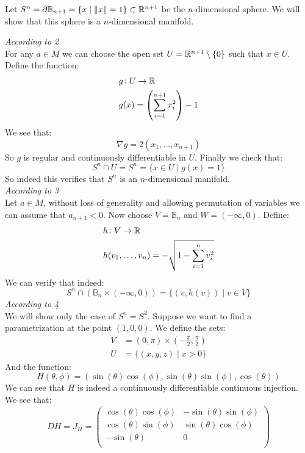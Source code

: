 \documentclass[11pt,a4paper]{article}
\begin{document}
\begin{example}
  Let $S^n = \partial \mathbb{B}_{n+1} = \{x \mid \|x\| = 1\} \subset 
  \mathbb{R}^{n+1}$ be the $n$-dimensional sphere. We will show that this
  sphere is a $n$-dimensional manifold.
\end{example}
\noindent
\emph{According to 2} \\
For any $a \in M$ we can choose the open set 
$U = \mathbb{R}^{n+1} \setminus \{0\}$ such that $x \in U$. Define the function:
\begin{align*}
  &g \colon U \to \mathbb{R} \\
  &g(x) = \left(\sum_{i=1}^{n+1}{x_i^2}\right) - 1
\end{align*}
We see that:
\[
  \nabla g = 2(x_1,\dots,x_{n+1})
\]
So $g$ is regular and continuously differentiable in $U$. Finally we
check that:
\[
  S^n \cap U = S^n = \{x \in U \mid g(x) = 1\}
\]
So indeed this verifies that $S^n$ is an $n$-dimensional manifold. \\
\noindent
\emph{According to 3} \\
Let $a \in M$, without loss of generality and allowing permutation
of variables we can assume that $a_{n+1} < 0$. Now choose 
$V = \mathbb{B}_n$ and $W = (-\infty,0)$. Define:
\begin{align*}
  &h \colon V \to \mathbb{R} \\
  &h(v_1,\dots,v_n) = - \sqrt{1 - \sum_{i=1}^{n}{v_i^2}}
\end{align*}
We can verify that indeed:
\[
  S^n \cap (\mathbb{B}_n \times (-\infty,0)) = \{(v,h(v)) \mid v \in V\}
\]
\emph{According to 4} \\
We will show only the case of $S^n = S^2$. Suppose we want to find
a parametrization at the point $(1,0,0)$. We define the sets:
\begin{align*}
  V &= (0,\pi) \times \left(-\frac{\pi}{2}, \frac{\pi}{2}\right) \\
  U &= \{(x,y,z) \mid x > 0\}
\end{align*}
And the function:
\[
  H(\theta, \phi) = 
  (\sin(\theta)\cos(\phi),\sin(\theta)\sin(\phi),\cos(\theta))
\]
We can see that $H$ is indeed a continuously differentiable continuous
injection. We see that:
\[
  DH = J_H = \begin{pmatrix}
        \cos(\theta)\cos(\phi) & -\sin(\theta)\sin(\phi)\\
        \cos(\theta)\sin(\phi) & \sin(\theta)\cos(\phi)\\
        -\sin(\theta) & 0\\
        \end{pmatrix}
\]
\end{document}
